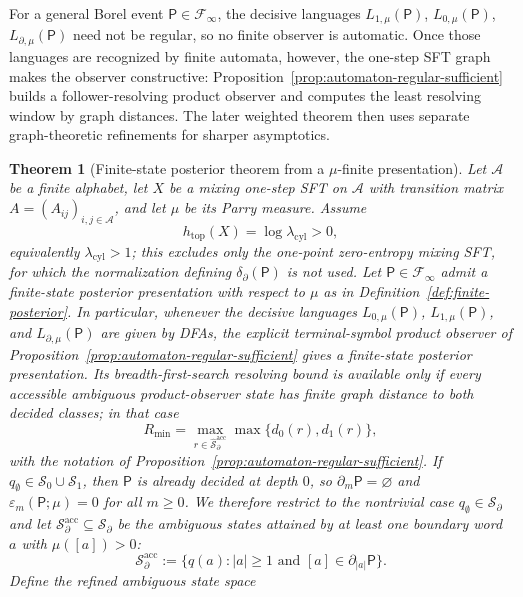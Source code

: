 \documentclass{etds}%
\numberwithin{equation}{section}
\theoremstyle{plain}
\newtheorem{theorem}{Theorem}[section]
\theoremstyle{definition}
\theoremstyle{remark}
\begin{document}
For a general Borel event $\mathsf{P}\in\mathcal{F}_\infty$, the decisive
languages $L_{1,\mu}(\mathsf{P})$, $L_{0,\mu}(\mathsf{P})$,
$L_{\partial,\mu}(\mathsf{P})$ need not be regular, so no finite observer is
automatic.  Once those languages are recognized by finite automata, however,
the one-step SFT graph makes the observer constructive:
Proposition~\ref{prop:automaton-regular-sufficient} builds a
follower-resolving product observer and computes the least resolving window by
graph distances.  The later weighted theorem then uses separate
graph-theoretic refinements for sharper asymptotics.

\begin{theorem}[Finite-state posterior theorem from a $\mu$-finite presentation]
\label{thm:finite-state-posterior}
Let $\mathcal{A}$ be a finite alphabet, let $X$ be a mixing one-step SFT on
$\mathcal{A}$ with transition matrix $A=(A_{ij})_{i,j\in\mathcal{A}}$, and let
$\mu$ be its Parry measure.  Assume
\[
h_{\mathrm{top}}(X)=\log\lambda_{\mathrm{cyl}}>0,
\]
equivalently $\lambda_{\mathrm{cyl}}>1$; this excludes only the one-point
zero-entropy mixing SFT, for which the normalization defining
$\delta_\partial(\mathsf{P})$ is not used.  Let
$\mathsf{P}\in\mathcal{F}_\infty$ admit a finite-state posterior presentation
with respect to $\mu$ as in Definition~\ref{def:finite-posterior}.  In
particular, whenever the decisive languages
$L_{0,\mu}(\mathsf{P})$, $L_{1,\mu}(\mathsf{P})$, and
$L_{\partial,\mu}(\mathsf{P})$ are given by DFAs, the explicit
terminal-symbol product observer of
Proposition~\ref{prop:automaton-regular-sufficient} gives a finite-state
posterior presentation.  Its breadth-first-search resolving bound is available
only if every accessible ambiguous product-observer state has finite graph
distance to both decided classes; in that case
\[
  R_{\min}
  =\max_{r\in \widehat{\mathcal{S}}_\partial^{\mathrm{acc}}}
  \max\{d_0(r),d_1(r)\},
\]
with the notation of Proposition~\ref{prop:automaton-regular-sufficient}.  If
$q_\emptyset\in\mathcal{S}_0\cup\mathcal{S}_1$, then $\mathsf{P}$ is already
decided at depth $0$, so $\partial_m\mathsf{P}=\varnothing$ and
$\varepsilon_m(\mathsf{P};\mu)=0$ for all $m\ge 0$.  We therefore restrict to
the nontrivial case
$q_\emptyset\in \mathcal{S}_\partial$
and let $\mathcal{S}_\partial^{\mathrm{acc}}\subseteq \mathcal{S}_\partial$ be the ambiguous states
attained by at least one boundary word $a$ with $\mu([a])>0$:
\[
\mathcal{S}_\partial^{\mathrm{acc}}
:=\{q(a):|a|\ge 1\text{ and }[a]\in \partial_{|a|}\mathsf{P}\}.
\]
Define the refined ambiguous state space

\end{theorem}
\end{document}
